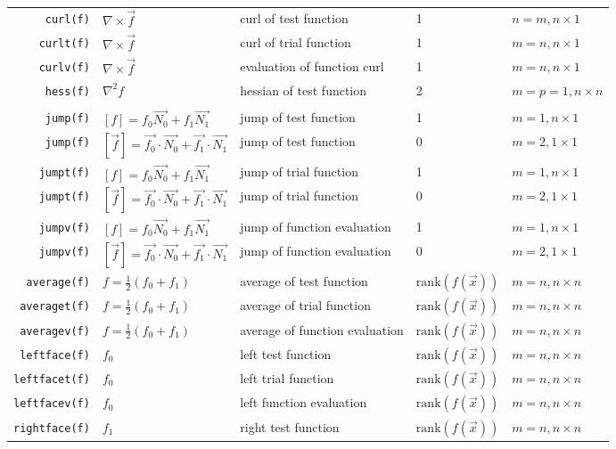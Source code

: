 \documentclass[11pt]{article}
\begin{document}
\begin{longtable}[c]{rllll}
  \lstinline!curl(f)! & $\nabla \times \overrightarrow{f}$ & curl of test function & 1 & $n=m, n\times 1$\\
  \lstinline!curlt(f)! & $\nabla \times \overrightarrow{f}$ & curl of trial function & 1 & $m=n, n\times 1$\\
  \lstinline!curlv(f)! & $\nabla \times \overrightarrow{f}$ & evaluation of  function curl  & 1 & $m=n, n\times 1$\\

  \lstinline!hess(f)! & $\nabla^2 f$ & hessian of test function & 2 & $m=p=1, n\times n$\\\hline\\

  \lstinline!jump(f)! & $[f]=f_0\overrightarrow{N_0}+f_1\overrightarrow{N_1}$ & jump of test function & 1   & $m=1, n\times 1$\\
  \lstinline!jump(f)! & $[\overrightarrow{f}]=\overrightarrow{f_0}\cdot\overrightarrow{N_0}+\overrightarrow{f_1}\cdot\overrightarrow{N_1}$ & jump of test function & 0   & $m=2, 1\times 1$\\
  \lstinline!jumpt(f)! & $[f]=f_0\overrightarrow{N_0}+f_1\overrightarrow{N_1}$ & jump of trial function & 1   & $m=1, n\times 1$\\
  \lstinline!jumpt(f)! & $[\overrightarrow{f}]=\overrightarrow{f_0}\cdot\overrightarrow{N_0}+\overrightarrow{f_1}\cdot\overrightarrow{N_1}$ & jump of trial function & 0   & $m=2, 1\times 1$\\
  \lstinline!jumpv(f)! & $[f]=f_0\overrightarrow{N_0}+f_1\overrightarrow{N_1}$ & jump of  function evaluation & 1   & $m=1, n\times 1$\\
  \lstinline!jumpv(f)! & $[\overrightarrow{f}]=\overrightarrow{f_0}\cdot\overrightarrow{N_0}+\overrightarrow{f_1}\cdot\overrightarrow{N_1}$ & jump of  function evaluation & 0   & $m=2, 1\times 1$\\
  \lstinline!average(f)! & ${f}=\frac{1}{2}(f_0+f_1)$ & average of test function & $\mathrm{rank}( f(\overrightarrow{x}))$   & $m=n, n\times n$\\
  \lstinline!averaget(f)! & ${f}=\frac{1}{2}(f_0+f_1)$ & average of trial function & $\mathrm{rank}( f(\overrightarrow{x}))$   & $m=n, n\times n$\\
  \lstinline!averagev(f)! & ${f}=\frac{1}{2}(f_0+f_1)$ & average of  function evaluation & $\mathrm{rank}( f(\overrightarrow{x}))$   & $m=n, n\times n$\\

  \lstinline!leftface(f)! & $f_0$ & left  test function & $\mathrm{rank}( f(\overrightarrow{x}))$   & $m=n, n\times n$\\
  \lstinline!leftfacet(f)! & $f_0$ & left  trial function & $\mathrm{rank}( f(\overrightarrow{x}))$   & $m=n, n\times n$\\
  \lstinline!leftfacev(f)! & $f_0$ & left   function evaluation & $\mathrm{rank}( f(\overrightarrow{x}))$   & $m=n, n\times n$\\
  \lstinline!rightface(f)! & $f_1$ & right  test function & $\mathrm{rank}( f(\overrightarrow{x}))$   & $m=n, n\times n$\\


\end{longtable}
\end{document}
